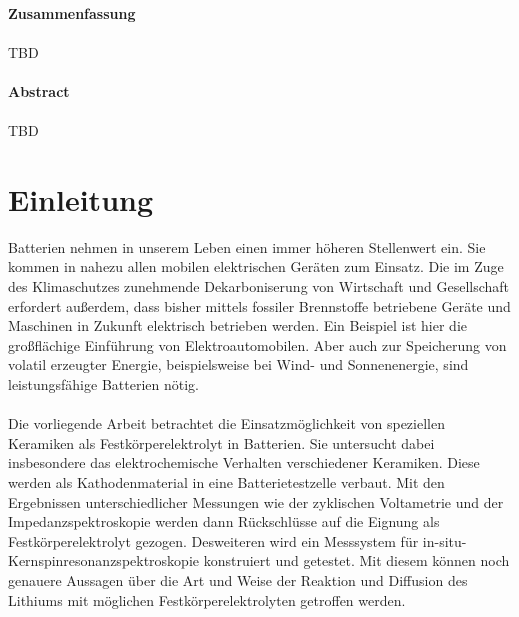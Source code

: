\documentclass[a4paper, 11pt, headsepline,footsepline,twoside,abstract]{scrbook}
\begin{document}
\newpage

\hspace{20mm} \\
\textbf{\Large{Zusammenfassung}}
\\\\
TBD
\\\\
\textbf{\Large{Abstract}}
\\\\
TBD
\pagestyle{toc}
\renewcommand*{\chapterpagestyle}{toc} %
\tableofcontents
{} 
\newpage
\cleardoubleemptypage
\pagestyle{normal}
\renewcommand*{\chapterpagestyle}{plain}
\setcounter{page}{1}
\chapter{Einleitung}
Batterien nehmen in unserem Leben einen immer höheren Stellenwert ein. Sie kommen in nahezu allen mobilen elektrischen Geräten zum Einsatz. Die im Zuge des Klimaschutzes zunehmende Dekarboniserung von Wirtschaft und Gesellschaft erfordert außerdem, dass bisher mittels fossiler Brennstoffe betriebene Geräte und Maschinen in Zukunft elektrisch betrieben werden. Ein Beispiel ist hier die großflächige Einführung von Elektroautomobilen. Aber auch zur Speicherung von volatil erzeugter Energie, beispielsweise bei Wind- und Sonnenenergie, sind leistungsfähige Batterien nötig.
\\\\
Die vorliegende Arbeit betrachtet die Einsatzmöglichkeit von speziellen Keramiken als Festkörperelektrolyt in Batterien. Sie untersucht dabei insbesondere das elektrochemische Verhalten verschiedener Keramiken. Diese werden als Kathodenmaterial in eine Batterietestzelle verbaut. Mit den Ergebnissen unterschiedlicher Messungen wie der zyklischen Voltametrie und der Impedanzspektroskopie werden dann Rückschlüsse auf die Eignung als Festkörperelektrolyt gezogen. Desweiteren wird ein Messsystem für in-situ-Kernspinresonanzspektroskopie konstruiert und getestet. Mit diesem können noch genauere Aussagen über die Art und Weise der Reaktion und Diffusion des Lithiums mit möglichen Festkörperelektrolyten getroffen werden.
\end{document}
